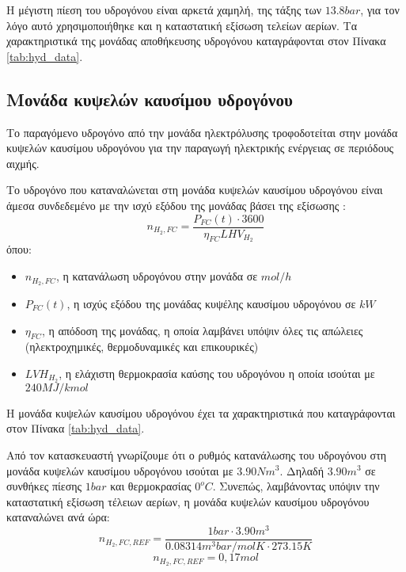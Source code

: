 Η μέγιστη πίεση του υδρογόνου είναι αρκετά χαμηλή, της τάξης των $13.8 bar$, για τον λόγο αυτό χρησιμοποιήθηκε και η καταστατική εξίσωση τελείων αερίων. Τα χαρακτηριστικά της μονάδας αποθήκευσης υδρογόνου καταγράφονται στον Πίνακα \ref{tab:hyd_data}.
        
\subsection{Μονάδα κυψελών καυσίμου υδρογόνου}

Το παραγόμενο υδρογόνο από την μονάδα ηλεκτρόλυσης τροφοδοτείται στην μονάδα κυψελών καυσίμου υδρογόνου για την παραγωγή ηλεκτρικής ενέργειας σε περιόδους αιχμής.

Το υδρογόνο που καταναλώνεται στη μονάδα κυψελών καυσίμου υδρογόνου είναι άμεσα συνδεδεμένο με την ισχύ εξόδου της μονάδας βάσει της εξίσωσης \cite{CAU2014820}:
\begin{equation}
   n_{Η_2,FC}=\frac{P_{FC}(t)\cdot3600}{\eta_{FC}LHV_{H_2}} \label{n_H2_FC}
\end{equation}
όπου:
\begin{itemize}
  \item[] $n_{Η_2,FC}$, η κατανάλωση υδρογόνου στην μονάδα σε $mol/h$
  \\
  \item[] $P_{FC}(t)$, η ισχύς εξόδου της μονάδας κυψέλης καυσίμου υδρογόνου σε $kW$
  \\
  \item[] $η_{FC}$, η απόδοση της μονάδας, η οποία λαμβάνει υπόψιν όλες τις απώλειες (ηλεκτροχημικές, θερμοδυναμικές και επικουρικές)
  \\
  \item[] $LVH_{H_2}$, η ελάχιστη θερμοκρασία καύσης του υδρογόνου η οποία ισούται με $240 MJ/kmol$ 
\end{itemize}   

Η μονάδα κυψελών καυσίμου υδρογόνου έχει τα χαρακτηριστικά που καταγράφονται στον Πίνακα \ref{tab:hyd_data}.

Από τον κατασκευαστή γνωρίζουμε ότι ο ρυθμός κατανάλωσης του υδρογόνου στη μονάδα κυψελών καυσίμου υδρογόνου ισούται με $3.90 Nm^3$. Δηλαδή $3.90 m^3$ σε συνθήκες πίεσης $1 bar$ και θερμοκρασίας $0^oC$. Συνεπώς, λαμβάνοντας υπόψιν την καταστατική εξίσωση τέλειων αερίων, η μονάδα κυψελών καυσίμου υδρογόνου καταναλώνει ανά ώρα:
\begin{equation}
    n_{Η_2,FC,REF}=\frac{1 bar \cdot 3.90 m^3}{0.08314 m^3bar/molK \cdot 273.15 K} \label{n_FC_REF}
\end{equation}
\begin{equation}
    n_{Η_2,FC,REF}=0,17 mol
\end{equation}


